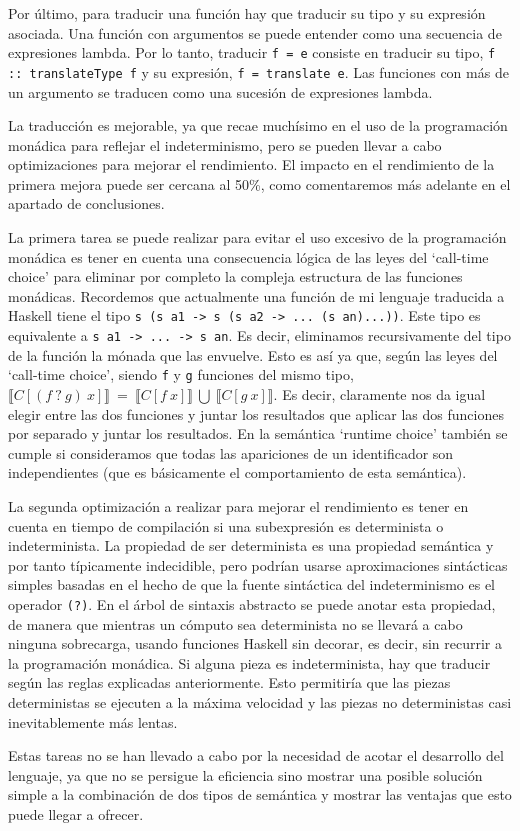 \documentclass[class=article, crop=false]{standalone}
\begin{document}
Por último, para traducir una función hay que traducir su tipo y su expresión asociada.
Una función con argumentos se puede entender como una secuencia de expresiones lambda. Por
lo tanto, traducir \verb`f = e` consiste en traducir su tipo, \verb`f :: translateType f` y
su expresión, \verb`f = translate e`. Las funciones con más de un argumento se traducen como
una sucesión de expresiones lambda.

La traducción es mejorable, ya que recae muchísimo en el uso de la programación monádica
para reflejar el indeterminismo, pero se pueden llevar a cabo optimizaciones para mejorar
el rendimiento. El impacto en el rendimiento de la primera mejora puede ser cercana al 50\%,
como comentaremos más adelante en el apartado de conclusiones.

La primera tarea se puede realizar para evitar el uso excesivo de la programación monádica
es tener en cuenta una consecuencia lógica de las leyes del `call-time choice' para eliminar
por completo la compleja estructura de las funciones monádicas. Recordemos que actualmente
una función de mi lenguaje traducida a Haskell tiene el tipo
\verb`s (s a1 -> s (s a2 -> ... (s an)...))`. Este tipo es equivalente a
\verb`s a1 -> ... -> s an`. Es decir, eliminamos recursivamente del tipo de la función la
mónada que las envuelve. Esto es así ya que, según las leyes del `call-time choice', siendo
\verb`f` y \verb`g` funciones del mismo tipo, $\llbracket C[(f \: ? \: g) \: x]\rrbracket
\: = \: \llbracket C[f \: x]\rrbracket \: \bigcup \: \llbracket C[g \: x]\rrbracket$. Es
decir, claramente nos da igual elegir entre las dos funciones y juntar los resultados que
aplicar las dos funciones por separado y juntar los resultados. En la semántica
`runtime choice' también se cumple si consideramos que todas las apariciones de un
identificador son  independientes (que es básicamente el comportamiento de esta semántica).

La segunda optimización a realizar para mejorar el rendimiento es tener en cuenta en tiempo
de compilación si una subexpresión es determinista o indeterminista. La propiedad de ser
determinista es una propiedad semántica y por tanto típicamente indecidible, pero podrían
usarse aproximaciones sintácticas simples basadas en el hecho de que la fuente sintáctica
del indeterminismo es el operador \verb`(?)`. En el árbol de sintaxis abstracto se puede
anotar esta propiedad, de manera que mientras un cómputo sea determinista no se llevará a
cabo ninguna sobrecarga, usando funciones Haskell sin decorar, es decir, sin recurrir a la
programación monádica. Si alguna pieza es indeterminista, hay que traducir según las reglas
explicadas anteriormente. Esto permitiría que las piezas deterministas se ejecuten a la
máxima velocidad y las piezas no deterministas casi inevitablemente más lentas.

Estas tareas no se han llevado a cabo por la necesidad de acotar el desarrollo del lenguaje,
ya que no se persigue la eficiencia sino mostrar una posible solución simple a la combinación
de dos tipos de semántica y mostrar las ventajas que esto puede llegar a ofrecer.
\end{document}
